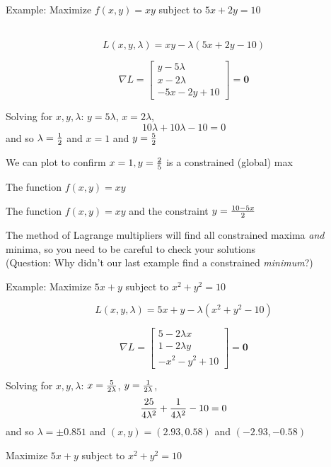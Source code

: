 \documentclass[10pt]{seminar}
\begin{document}
\begin{slide}
\begin{enumerate}
\end{enumerate}

\newslide

Example: Maximize $f(x, y)=xy$ subject to $5x+2y=10$

\ \\$$L(x, y, \lambda)=xy-\lambda(5x+2y-10)$$

$$\nabla L=\begin{bmatrix}
y-5\lambda\\
x-2\lambda \\
-5x-2y+10
\end{bmatrix} =\mathbf{0}$$

Solving for $x, y, \lambda$: $y=5\lambda$, $x=2\lambda$, $$10\lambda+10\lambda-10=0 $$ and so $\lambda ={1\over 2}$  and $x=1$ and $y={5\over 2}$

\newslide
We can plot to confirm $x=1, y={2\over 5}$ is a constrained (global) max

\begin{center}
The function $f(x, y)=xy$


The function $f(x, y)=xy$ and the constraint $y={{10-5x}\over{2}}$

\end{center}

\newslide
The method of Lagrange multipliers will find all constrained maxima \textit{and} minima, so you need to be careful to check your solutions \\(Question: Why didn't our last example find a constrained \textit{minimum}?)

Example: Maximize $5x+y$ subject to $x^2+y^2=10$

$$L(x, y, \lambda)=5x+y-\lambda(x^2+y^2-10)$$

$$\nabla L=\begin{bmatrix}
5-2\lambda x\\
1-2 \lambda y\\
-x^2-y^2+10
\end{bmatrix} =\mathbf{0}$$

Solving for $x, y, \lambda$: $x={5\over 2\lambda}$, $y={1\over 2\lambda}$, $${{25}\over{4\lambda^2}}+{{1}\over{4\lambda^2}}-10=0 $$ and so $\lambda =\pm 0.851$  and $(x, y)=(2.93, 0.58)$ and $(-2.93, -0.58)$

\newslide
Maximize $5x+y$  subject to $x^2+y^2=10$


\end{slide}
\end{document}
